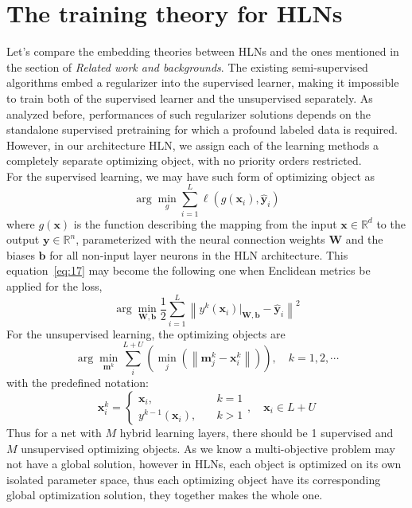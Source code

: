 \documentclass[3p,times,procedia]{elsarticle}
\begin{document}
\section{The training theory for HLNs}
Let's compare the embedding theories between
HLNs and the ones mentioned in the section of
\emph{Related work and backgrounds}.
The existing semi-supervised algorithms
embed a regularizer into the supervised 
learner, making it impossible to train both of
the supervised learner and the unsupervised
separately. As analyzed before, performances
of such regularizer solutions depends on the
standalone supervised pretraining for which
a profound labeled data is required.
However, in our architecture HLN, we assign
each of the learning methods a completely
separate optimizing object, with no priority
orders restricted.\\
For the supervised learning, we may have such
form of optimizing object as
\begin{equation}
	\arg \min_g \sum_{i=1}^L\ell\left(
	g(\mathbf{x}_i),
	\mathbf{\hat{y}}_i
	\right)
	\label{eq:17}
\end{equation}
where $g(\mathbf{x})$ is the function describing
the mapping from the input 
$\mathbf{x}\in\mathbb{R}^d$ to the output
$\mathbf{y}\in\mathbb{R}^n$, parameterized with
the neural connection weights $\mathbf{W}$ and 
the biases $\mathbf{b}$ for all non-input 
layer neurons in the HLN architecture.
This equation~\ref{eq:17} may become the 
following one when Enclidean metrics be 
applied for the loss,
\begin{equation}
	\arg \min_{\mathbf{W},\mathbf{b}}
	\frac{1}{2}
	\sum_{i=1}^L
	\left\|
	y^k(
	\mathbf{x}_i)\big|_{\mathbf{W},\mathbf{b}}-
	\mathbf{\hat{y}}_i
	\right\|^2
	\label{eq:18}
\end{equation}
For the unsupervised learning, the optimizing
objects are
\begin{equation}
	\arg \min_{\mathbf{m}^k}
	\sum_i^{L+U}
	\left(
	\min_j\left(
	\left\|
	\mathbf{m}^k_j-\mathbf{x}^k_i
	\right\|
	\right)
	\right),\quad k=1,2,\cdots
	\label{eq:19}
\end{equation}
with the predefined notation:
\begin{equation}
	\mathbf{x}_i^k=
	\left\{
		\begin{aligned}
			\mathbf{x}_i,\quad & k=1\\
			y^{k-1}(\mathbf{x}_i),\quad & k>1
		\end{aligned}
	\right.
	,\quad \mathbf{x}_i\in L+U
	\label{eq:20}
\end{equation}
Thus for a net with $M$ hybrid learning layers,
there should be 1 supervised
and $M$ unsupervised optimizing objects.
As we know a multi-objective problem may not 
have a global solution, however in HLNs,
each object is optimized on its own isolated
parameter space, thus each optimizing object
have its corresponding global optimization 
solution, they together makes the whole one.
\end{document}
